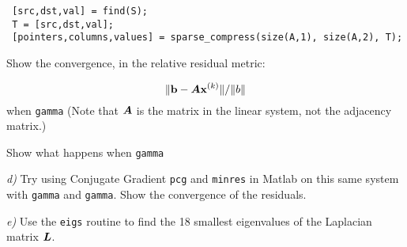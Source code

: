 \documentclass{article}
\begin{document}
\begin{verbatim} [src,dst,val] = find(S); 
 T = [src,dst,val];
 [pointers,columns,values] = sparse_compress(size(A,1), size(A,2), T);\end{verbatim}
Show the convergence, in the relative residual metric:

\begin{displaymath}
\|\boldsymbol{\mathrm{b}} - \boldsymbol{A} \boldsymbol{\mathrm{x}}^{(k)}\|/\|b\|
\end{displaymath}
when {\colorbox[rgb]{1.00,0.93,1.00}{\tt gamma}} (Note that $\boldsymbol{A}$ is the matrix in the linear system, not the adjacency matrix.)

Show what happens when {\colorbox[rgb]{1.00,0.93,1.00}{\tt gamma}}

\emph{d)} Try using Conjugate Gradient {\colorbox[rgb]{1.00,0.93,1.00}{\tt pcg}} and {\colorbox[rgb]{1.00,0.93,1.00}{\tt minres}} in Matlab on this same system with {\colorbox[rgb]{1.00,0.93,1.00}{\tt gamma}} and {\colorbox[rgb]{1.00,0.93,1.00}{\tt gamma}}. Show the convergence of the residuals.

\emph{e)} Use the {\colorbox[rgb]{1.00,0.93,1.00}{\tt eigs}} routine to find the 18 smallest eigenvalues of the Laplacian matrix $\boldsymbol{L}$.
\end{document}
